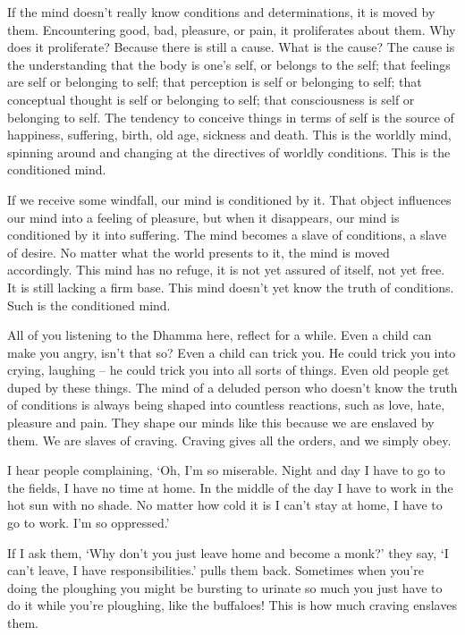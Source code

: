 If the mind doesn't really know conditions and determinations, it is moved by them. Encountering good, bad, pleasure, or pain, it proliferates about them. Why does it proliferate? Because there is still a cause. What is the cause? The cause is the understanding that the body is one's self, or belongs to the self; that feelings are self or belonging to self; that perception is self or belonging to self; that conceptual thought is self or belonging to self; that consciousness is self or belonging to self. The tendency to conceive things in terms of self is the source of happiness, suffering, birth, old age, sickness and death. This is the worldly mind, spinning around and changing at the directives of worldly conditions. This is the conditioned mind. 

If we receive some windfall, our mind is conditioned by it. That object influences our mind into a feeling of pleasure, but when it disappears, our mind is conditioned by it into suffering. The mind becomes a slave of conditions, a slave of desire. No matter what the world presents to it, the mind is moved accordingly. This mind has no refuge, it is not yet assured of itself, not yet free. It is still lacking a firm base. This mind doesn't yet know the truth of conditions. Such is the conditioned mind. 

All of you listening to the Dhamma here, reflect for a while. Even a child can make you angry, isn't that so? Even a child can trick you. He could trick you into crying, laughing -- he could trick you into all sorts of things. Even old people get duped by these things. The mind of a deluded person who doesn't know the truth of conditions is always being shaped into countless reactions, such as love, hate, pleasure and pain. They shape our minds like this because we are enslaved by them. We are slaves of  craving. Craving gives all the orders, and we simply obey. 

I hear people complaining, `Oh, I'm so miserable. Night and day I have to go to the fields, I have no time at home. In the middle of the day I have to work in the hot sun with no shade. No matter how cold it is I can't stay at home, I have to go to work. I'm so oppressed.' 

If I ask them, `Why don't you just leave home and become a monk?' they say, `I can't leave, I have responsibilities.'  pulls them back. Sometimes when you're doing the ploughing you might be bursting to urinate so much you just have to do it while you're ploughing, like the buffaloes! This is how much craving enslaves them. 

